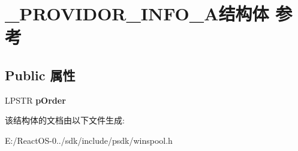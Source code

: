 \hypertarget{struct___p_r_o_v_i_d_o_r___i_n_f_o__2_a}{}\section{\+\_\+\+P\+R\+O\+V\+I\+D\+O\+R\+\_\+\+I\+N\+F\+O\+\_\+A结构体 参考}
\label{struct___p_r_o_v_i_d_o_r___i_n_f_o__2_a}
\subsection*{Public 属性}
\begin{DoxyCompactItemize}
\item 
\mbox{\label{struct___p_r_o_v_i_d_o_r___i_n_f_o__2_a_a328e98f8a778a66bc6dfa39516359ad3}} 
L\+P\+S\+TR {\bfseries p\+Order}
\end{DoxyCompactItemize}


该结构体的文档由以下文件生成\+:\begin{DoxyCompactItemize}
\item 
E\+:/\+React\+O\+S-\/0../sdk/include/psdk/winspool.\+h\end{DoxyCompactItemize}
